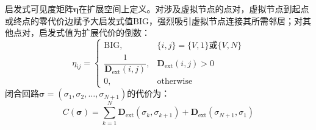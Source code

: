 \documentclass[lettersize,journal]{IEEEtran}
\begin{document}
启发式可见度矩阵$\bm{\eta}$在扩展空间上定义。对涉及虚拟节点的点对，虚拟节点到起点或终点的零代价边赋予大启发式值$\mathrm{BIG}$，强烈吸引虚拟节点连接其所需邻居；对其他点对，启发式值为扩展代价的倒数：
\begin{equation}
\eta_{ij} =
\begin{cases}
\mathrm{BIG}, & \{i, j\} = \{V, 1\} \text{或} \{V, N\} \\
\dfrac{1}{\mathbf{D}_{\mathrm{ext}}(i,j)}, & \mathbf{D}_{\mathrm{ext}}(i,j) > 0 \\
0, & \text{otherwise}
\end{cases}
\label{eq:eta}
\end{equation}
闭合回路$\bm{\sigma} = (\sigma_1, \sigma_2, \dots, \sigma_{N+1})$的代价为：
\begin{equation}
C(\bm{\sigma}) = \sum_{k=1}^{N} \mathbf{D}_{\mathrm{ext}}(\sigma_k, \sigma_{k+1}) + \mathbf{D}_{\mathrm{ext}}(\sigma_{N+1}, \sigma_1)
\label{eq:tourcost}
\end{equation}
\end{document}
